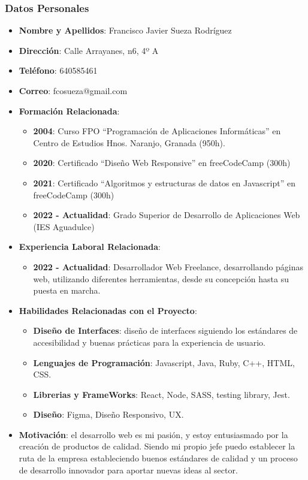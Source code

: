 \subsubsection{Datos Personales}
\begin{itemize}
    \item \textbf{Nombre y Apellidos}: Francisco Javier Sueza Rodríguez
    \item \textbf{Dirección}: Calle Arrayanes, n6, 4º A
    \item \textbf{Teléfono}: 640585461
    \item \textbf{Correo}: fcosueza@gmail.com
    \item \textbf{Formación Relacionada}:
    \begin{itemize}
        \item \textbf{2004}: Curso FPO “Programación de Aplicaciones Informáticas” en Centro de Estudios Hnos.
        Naranjo, Granada (950h).
        \item \textbf{2020}: Certificado “Diseño Web Responsive” en freeCodeCamp (300h)
        \item \textbf{2021}: Certificado “Algoritmos y estructuras de datos en Javascript” en freeCodeCamp (300h)
        \item \textbf{2022 - Actualidad}: Grado Superior de Desarrollo de Aplicaciones Web (IES Aguadulce)
    \end{itemize}
    \item \textbf{Experiencia Laboral Relacionada}:
    \begin{itemize}
        \item \textbf{2022 - Actualidad}: Desarrollador Web Freelance, desarrollando páginas web, utilizando diferentes herramientas, desde su concepción hasta su puesta en marcha.
    \end{itemize}
    \item \textbf{Habilidades Relacionadas con el Proyecto}:
    \begin{itemize}
        \item \textbf{Diseño de Interfaces}: diseño de interfaces siguiendo los estándares de accesibilidad y buenas prácticas para la experiencia de usuario.
        \item \textbf{Lenguajes de Programación}: Javascript, Java, Ruby, C++, HTML, CSS.
        \item \textbf{Librerias y FrameWorks}: React, Node, SASS, testing library, Jest.
        \item \textbf{Diseño}: Figma, Diseño Responsivo, UX.
    \end{itemize}
    \item \textbf{Motivación}: el desarrollo web es mi pasión, y estoy entusiasmado por la creación de productos de calidad. Siendo mi propio jefe puedo establecer la ruta de la empresa estableciendo buenos estándares de calidad y un proceso de desarrollo innovador para aportar nuevas ideas al sector.
\end{itemize}

